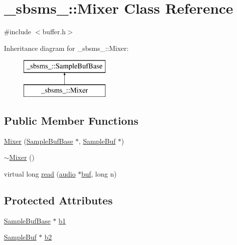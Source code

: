 \hypertarget{class__sbsms___1_1_mixer}{}\section{\+\_\+sbsms\+\_\+\+:\+:Mixer Class Reference}
\label{class__sbsms___1_1_mixer}


{\ttfamily \#include $<$buffer.\+h$>$}

Inheritance diagram for \+\_\+sbsms\+\_\+\+:\+:Mixer\+:\begin{figure}[H]
\begin{center}
\leavevmode
\includegraphics[height=2.000000cm]{class__sbsms___1_1_mixer}
\end{center}
\end{figure}
\subsection*{Public Member Functions}
\begin{DoxyCompactItemize}
\item 
\hyperlink{class__sbsms___1_1_mixer_aabade67b89e260a1eff988237f7ce593}{Mixer} (\hyperlink{class__sbsms___1_1_sample_buf_base}{Sample\+Buf\+Base} $\ast$, \hyperlink{namespace__sbsms___a8cd0992a16c2cc5448b63d446239c196}{Sample\+Buf} $\ast$)
\item 
\hyperlink{class__sbsms___1_1_mixer_a1a449b69135f1956fede1599b5b52f84}{$\sim$\+Mixer} ()
\item 
virtual long \hyperlink{class__sbsms___1_1_mixer_a92637e536f821f9c0d7fd20475a0f08c}{read} (\hyperlink{namespace__sbsms___a11786cc5bd221ff534972ae350477324}{audio} $\ast$\hyperlink{xlstr_8c_a781718f5b53a876fe91c424c4607fa8f}{buf}, long n)
\end{DoxyCompactItemize}
\subsection*{Protected Attributes}
\begin{DoxyCompactItemize}
\item 
\hyperlink{class__sbsms___1_1_sample_buf_base}{Sample\+Buf\+Base} $\ast$ \hyperlink{class__sbsms___1_1_mixer_ab98cd54953287c4198573daf6780a7f2}{b1}
\item 
\hyperlink{namespace__sbsms___a8cd0992a16c2cc5448b63d446239c196}{Sample\+Buf} $\ast$ \hyperlink{class__sbsms___1_1_mixer_af5b3c0577c3e53a7e5c0bea9955afb22}{b2}
\end{DoxyCompactItemize}


